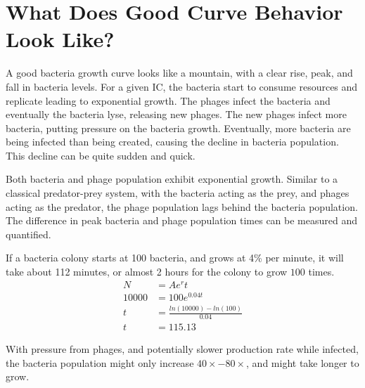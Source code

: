 \section{What Does Good Curve Behavior Look Like?}
A good bacteria growth curve looks like a mountain, with a clear rise, peak, and fall in bacteria levels. 
For a given IC, the bacteria start to consume resources and replicate leading to exponential growth. 
The phages infect the bacteria and eventually the bacteria lyse, releasing new phages. 
The new phages infect more bacteria, putting pressure on the bacteria growth. 
Eventually, more bacteria are being infected than being created, causing the decline in bacteria population. 
This decline can be quite sudden and quick. 

Both bacteria and phage population exhibit exponential growth. 
Similar to a classical predator-prey system, with the bacteria acting as the prey, and phages acting as the predator, the phage population lags behind the bacteria population.
The difference in peak bacteria and phage population times can be measured and quantified. 

If a bacteria colony starts at 100 bacteria, and grows at 4\% per minute, it will take about 112 minutes, or almost 2 hours for the colony to grow $100$ times. 
\begin{align}
    N &= Ae^rt \\ 
    10000 &= 100e^{0.04t} \\
    t &= \frac{ln(10000) - ln(100)}{0.04} \\
    t &= 115.13
\end{align}

With pressure from phages, and potentially slower production rate while infected, the bacteria population might only increase $40\times - 80\times$, and might take longer to grow. 